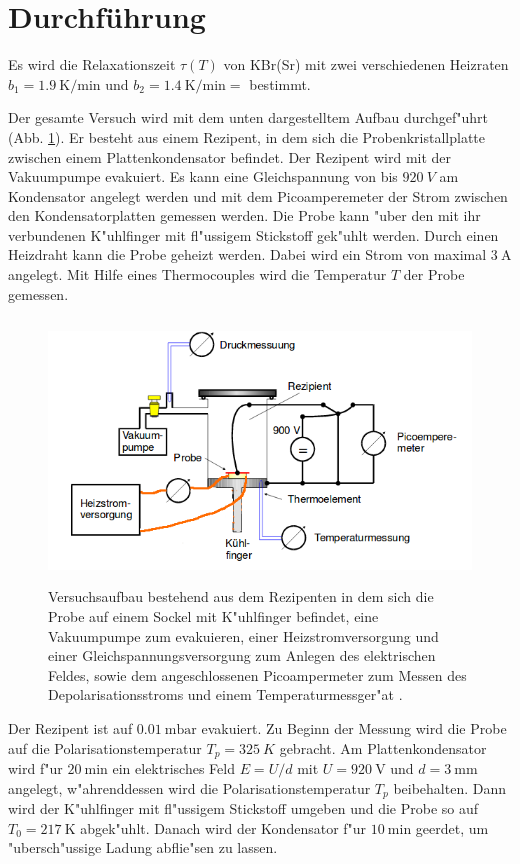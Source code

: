 \section{Durchführung}
\label{sec:Durchführung}
  Es wird die Relaxationszeit $\tau(T)$ von KBr(Sr) mit zwei verschiedenen Heizraten $b_1=\SI{1,9}{\kelvin}/\si{\minute}$ und $b_2=\SI{1,4}{\kelvin}/\si{\minute}=$ bestimmt.

  Der gesamte Versuch wird mit dem unten dargestelltem Aufbau durchgef"uhrt (Abb. \ref{fig:aufbau}).
  Er besteht aus einem Rezipent, in dem sich die Probenkristallplatte zwischen einem Plattenkondensator befindet.
  Der Rezipent wird mit der Vakuumpumpe evakuiert.
  Es kann eine Gleichspannung von bis $\SI{920}{V}$ am Kondensator angelegt werden und mit dem Picoamperemeter der Strom zwischen den Kondensatorplatten gemessen werden.
  Die Probe kann "uber den mit ihr verbundenen K"uhlfinger mit fl"ussigem Stickstoff gek"uhlt werden.
  Durch einen Heizdraht kann die Probe geheizt werden.
  Dabei wird ein Strom von maximal $\SI{3}{\ampere}$ angelegt.
  Mit Hilfe eines Thermocouples wird die Temperatur $T$ der Probe gemessen.
  \begin{figure}[H]
    \centering
    \includegraphics[height=7cm]{bilder/Aufbau.png}
    \caption{Versuchsaufbau bestehend aus dem Rezipenten in dem sich die Probe auf einem Sockel mit K"uhlfinger befindet, eine Vakuumpumpe zum evakuieren, einer Heizstromversorgung und einer Gleichspannungsversorgung zum Anlegen des elektrischen Feldes, sowie dem angeschlossenen Picoampermeter zum Messen des Depolarisationsstroms und einem Temperaturmessger"at \cite{Anleitung}.}
    \label{fig:aufbau}
  \end{figure}
  Der Rezipent ist auf $\SI{0,01}{\milli \bar}$
  evakuiert.
  Zu Beginn der Messung wird die Probe auf die Polarisationstemperatur $T_p=\SI{325}{K}$ gebracht. Am Plattenkondensator wird f"ur $\SI{20}{\minute}$ ein elektrisches Feld $E=U/d$ mit $U=\SI{920}{\volt}$ und $d=\SI{3}{\milli \meter}$ angelegt, w"ahrenddessen wird die Polarisationstemperatur $T_p$ beibehalten.
  Dann wird der K"uhlfinger mit fl"ussigem Stickstoff umgeben und die Probe so auf $T_0=\SI{217}{\kelvin}$ abgek"uhlt.
  Danach wird der Kondensator f"ur $\SI{10}{\minute}$ geerdet, um "ubersch"ussige Ladung abflie"sen zu lassen.

